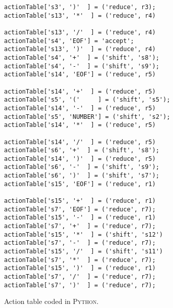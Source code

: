 \begin{figure}[!ht]
\begin{Verbatim}
actionTable['s3', ')'  ] = ('reduce', r3);      actionTable['s13', '*'  ] = ('reduce', r4)   
                                                actionTable['s13', '/'  ] = ('reduce', r4)   
actionTable['s4', 'EOF'] = 'accept';            actionTable['s13', ')'  ] = ('reduce', r4)   
actionTable['s4', '+'  ] = ('shift', 's8');                                                  
actionTable['s4', '-'  ] = ('shift', 's9');     actionTable['s14', 'EOF'] = ('reduce', r5)   
                                                actionTable['s14', '+'  ] = ('reduce', r5)   
actionTable['s5', '('     ] = ('shift', 's5');  actionTable['s14', '-'  ] = ('reduce', r5)   
actionTable['s5', 'NUMBER'] = ('shift', 's2');  actionTable['s14', '*'  ] = ('reduce', r5)   
                                                actionTable['s14', '/'  ] = ('reduce', r5)   
actionTable['s6', '+'  ] = ('shift', 's8');     actionTable['s14', ')'  ] = ('reduce', r5)   
actionTable['s6', '-'  ] = ('shift', 's9');                                                  
actionTable['s6', ')'  ] = ('shift', 's7');     actionTable['s15', 'EOF'] = ('reduce', r1)   
                                                actionTable['s15', '+'  ] = ('reduce', r1)   
actionTable['s7', 'EOF'] = ('reduce', r7);      actionTable['s15', '-'  ] = ('reduce', r1)   
actionTable['s7', '+'  ] = ('reduce', r7);      actionTable['s15', '*'  ] = ('shift', 's12') 
actionTable['s7', '-'  ] = ('reduce', r7);      actionTable['s15', '/'  ] = ('shift', 's11') 
actionTable['s7', '*'  ] = ('reduce', r7);      actionTable['s15', ')'  ] = ('reduce', r1)   
actionTable['s7', '/'  ] = ('reduce', r7);
actionTable['s7', ')'  ] = ('reduce', r7);
\end{Verbatim}
\vspace*{-0.3cm}
\caption{Action table coded in \textsc{Python}.}
\label{fig:parse-table.stlx:action}
\end{figure}

 
